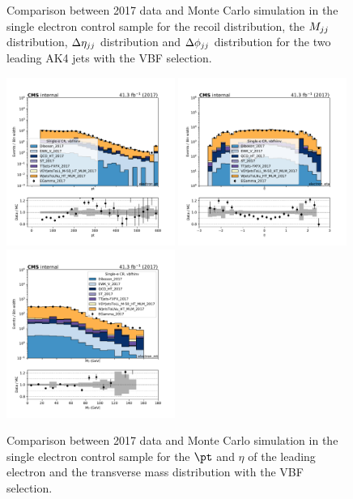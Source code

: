 \begin{figure}[htbp]
\begin{center}
    \end{center}
    \caption{Comparison between 2017 data and Monte Carlo simulation in the single electron control sample for
        the recoil distribution, the $M_{jj}$ distribution, $\Delta \eta_{jj}$ distribution and $\Delta \phi_{jj}$ distribution
        for the two leading AK4 jets with the VBF selection.}
    \label{fig:SE_vbfhinv_2017}
\end{figure}

\begin{figure}[htbp]
    \begin{center}
        \includegraphics[width=0.49\textwidth]{fig/datamc/cr_1e_vbf/cr_1e_vbf_electron_pt_losf_2017.pdf}
        \includegraphics[width=0.49\textwidth]{fig/datamc/cr_1e_vbf/cr_1e_vbf_electron_eta_losf_2017.pdf} \\
        \includegraphics[width=0.49\textwidth]{fig/datamc/cr_1e_vbf/cr_1e_vbf_electron_mt_losf_2017.pdf}
    \end{center}
    \caption{Comparison between 2017 data and Monte Carlo simulation in the single electron control sample for
        the $\pt$ and $\eta$ of the leading electron and the transverse mass distribution with the VBF selection.}
    \label{fig:SE_2_vbfhinv_2017}
\end{figure}


